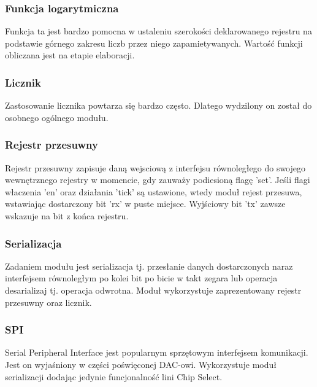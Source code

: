 \documentclass[a4paper,12pt]{article}
\begin{document}
\subsubsection{Funkcja logarytmiczna}
Funkcja ta jest bardzo pomocna w ustaleniu szerokości deklarowanego rejestru na podstawie górnego zakresu liczb przez niego zapamietywanych. Wartość funkcji obliczana jest na etapie elaboracji.


\subsubsection{Licznik}
Zastosowanie licznika powtarza się bardzo często. Dlatego wydzilony on został do osobnego ogólnego modułu.


\subsubsection{Rejestr przesuwny}
Rejestr przesuwny zapisuje daną wejsciową z interfejsu równoległego do swojego wewnętrznego rejestry w momencie, gdy zauważy podiesioną flagę 'set'. Jeśli flagi właczenia 'en' oraz działania 'tick' są ustawione, wtedy moduł rejest przesuwa, wstawiając dostarczony bit 'rx' w puste miejsce. Wyjściowy bit 'tx' zawsze wskazuje na bit z końca rejestru.


\subsubsection{Serializacja}
Zadaniem modułu jest serializacja tj. przesłanie danych dostarczonych naraz interfejsem równoległym po kolei bit po bicie w takt zegara lub operacja desarializaj tj. operacja odwrotna. Moduł wykorzystuje zaprezentowany rejestr przesuwny oraz licznik.


\subsubsection{SPI}
Serial Peripheral Interface jest popularnym sprzętowym interfejsem komunikacji. Jest on wyjaśniony w części poświęconej DAC-owi. Wykorzystuje moduł serializacji dodając jedynie funcjonalność lini Chip Select.

\end{document}
